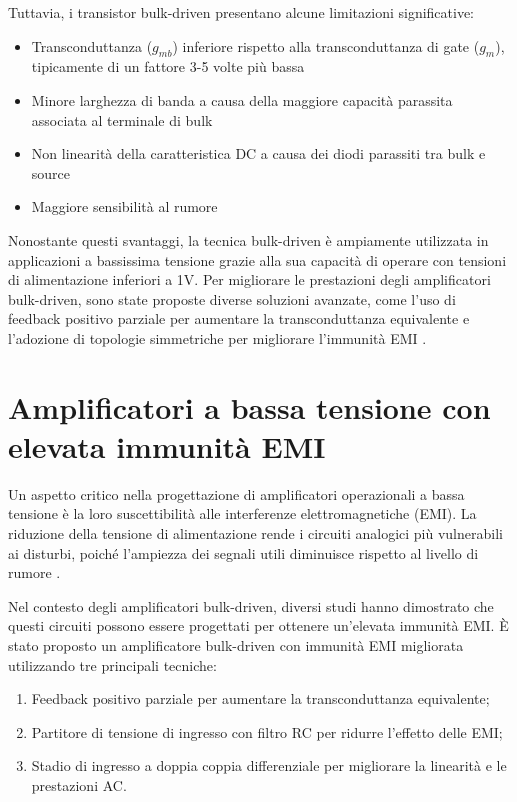 Tuttavia, i transistor bulk-driven presentano alcune limitazioni significative:
\begin{itemize}
   \item Transconduttanza ($g_{mb}$) inferiore rispetto alla transconduttanza di gate ($g_m$), tipicamente di un fattore 3-5 volte più bassa
   \item Minore larghezza di banda a causa della maggiore capacità parassita associata al terminale di bulk
   \item Non linearità della caratteristica DC a causa dei diodi parassiti tra bulk e source
   \item Maggiore sensibilità al rumore
\end{itemize}

Nonostante questi svantaggi, la tecnica bulk-driven è ampiamente utilizzata in applicazioni a bassissima tensione grazie alla sua capacità di operare con tensioni di alimentazione inferiori a 1V. Per migliorare le prestazioni degli amplificatori bulk-driven, sono state proposte diverse soluzioni avanzate, come l'uso di feedback positivo parziale per aumentare la transconduttanza equivalente e l'adozione di topologie simmetriche per migliorare l'immunità EMI \cite{Bulk-Driven_CMOS_Amplifier_With_High_EMI_Immunity}.

\section{Amplificatori a bassa tensione con elevata immunità EMI}

Un aspetto critico nella progettazione di amplificatori operazionali a bassa tensione è la loro suscettibilità alle interferenze elettromagnetiche (EMI). La riduzione della tensione di alimentazione rende i circuiti analogici più vulnerabili ai disturbi, poiché l'ampiezza dei segnali utili diminuisce rispetto al livello di rumore \cite{Design_considerations_for_an_ultra-low_voltage_amplifier_with_high_EMI_immunity, Redoute-Richelli_EMC_Magazine}.

Nel contesto degli amplificatori bulk-driven, diversi studi hanno dimostrato che questi circuiti possono essere progettati per ottenere un'elevata immunità EMI. È stato proposto \cite{Bulk-Driven_CMOS_Amplifier_With_High_EMI_Immunity} un amplificatore bulk-driven con immunità EMI migliorata utilizzando tre principali tecniche:

\begin{enumerate}
   \item Feedback positivo parziale per aumentare la transconduttanza equivalente;
   \item Partitore di tensione di ingresso con filtro RC per ridurre l'effetto delle EMI;
   \item Stadio di ingresso a doppia coppia differenziale per migliorare la linearità e le prestazioni AC.
\end{enumerate}

